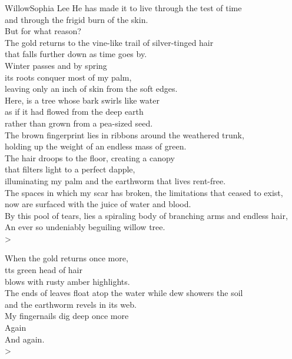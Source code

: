 \begin{poetry}{Willow}{Sophia Lee}
    He has made it to live through the test of time\\
    and through the frigid burn of the skin.\\
    But for what reason?\\
    The gold returns to the vine-like trail of silver-tinged hair\\
    that falls further down as time goes by.\\
    Winter passes and by spring\\
    its roots conquer most of my palm,\\
    leaving only an inch of skin from the soft edges.\\
    Here, is a tree whose bark swirls like water\\
    as if it had flowed from the deep earth\\
    rather than grown from a pea-sized seed.\\
    The brown fingerprint lies in ribbons around the weathered trunk,\\
    holding up the weight of an endless mass of green.\\
    The hair droops to the floor, creating a canopy\\
    that filters light to a perfect dapple,\\
    illuminating my palm and the earthworm that lives rent-free.\\
    The spaces in which my scar has broken, the limitations that ceased to exist,\\
    now are surfaced with the juice of water and blood.\\
    By this pool of tears, lies a spiraling body of branching arms and endless hair,\\
    An ever so undeniably beguiling willow tree.\\>
    
    When the gold returns once more,\\
    tts green head of hair\\
    blows with rusty amber highlights.\\
    The ends of leaves float atop the water while dew showers the soil\\
    and the earthworm revels in its web.\\
    My fingernails dig deep once more\\
    Again\\
    And again.\\>
    

\end{poetry}
